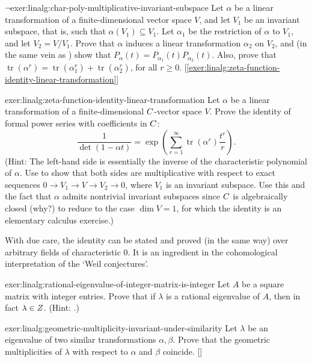 \begin{exer}{$\lnot$}{exer:linalg:char-poly-multiplicative-invariant-subspace}
  Let $\alpha$ be a linear transformation of a finite-dimensional
  vector space $V$, and let $V_1$ be an invariant subspace, that is,
  such that $\alpha(V_1) \subseteq V_1$. Let $\alpha_1$ be the
  restriction of $\alpha$ to $V_1$, and let $V_2 = V/V_1$. Prove that
  $\alpha$ induces a linear transformation $\alpha_2$ on $V_2$, and
  (in the same vein as
  ) show that
  $P_\alpha(t) = P_{\alpha_1}(t)P_{\alpha_2}(t)$.  Also, prove that
  $\operatorname{tr}(\alpha^r) = \operatorname{tr}(\alpha_1^r) +
  \operatorname{tr}(\alpha_2^r)$, for all $r \geq
  0$. [\ref{exer:linalg:zeta-function-identity-linear-transformation}]
\end{exer}
\begin{exer}{}{exer:linalg:zeta-function-identity-linear-transformation}
  Let $\alpha$ be a linear transformation of a finite-dimensional
  $C$-vector space $V$. Prove the identity of formal power series
  with coefficients in $C$:
  \[
    \frac{1}{\det(1-\alpha t)} = \exp \left( \sum_{r=1}^\infty
      \operatorname{tr}(\alpha^r) \frac{t^r}{r} \right).
  \]
  (Hint: The left-hand side is essentially the inverse of the
  characteristic polynomial of $\alpha$. Use
   to
  show that both sides are multiplicative with respect to exact
  sequences $0 \to V_1 \to V \to V_2 \to 0$, where $V_1$ is an
  invariant subspace. Use this and the fact that $\alpha$ admits
  nontrivial invariant subspaces since $C$ is algebraically closed
  (why?) to reduce to the case $\dim V = 1$, for which the identity is
  an elementary calculus exercise.)

  With due care, the identity can be stated and proved (in the same
  way) over arbitrary fields of characteristic $0$. It is an
  ingredient in the cohomological interpretation of the `Weil
  conjectures'.
\end{exer}
\begin{exer}{}{exer:linalg:rational-eigenvalue-of-integer-matrix-is-integer}
  Let $A$ be a square matrix with integer entries. Prove that if
  $\lambda$ is a rational eigenvalue of $A$, then in fact
  $\lambda \in Z$. (Hint: .)
\end{exer}
\begin{exer}{\exerused}{exer:linalg:geometric-multiplicity-invariant-under-similarity}
  Let $\lambda$ be an eigenvalue of two similar transformations
  $\alpha, \beta$. Prove that the geometric multiplicities of
  $\lambda$ with respect to $\alpha$ and $\beta$
  coincide. []
\end{exer}
